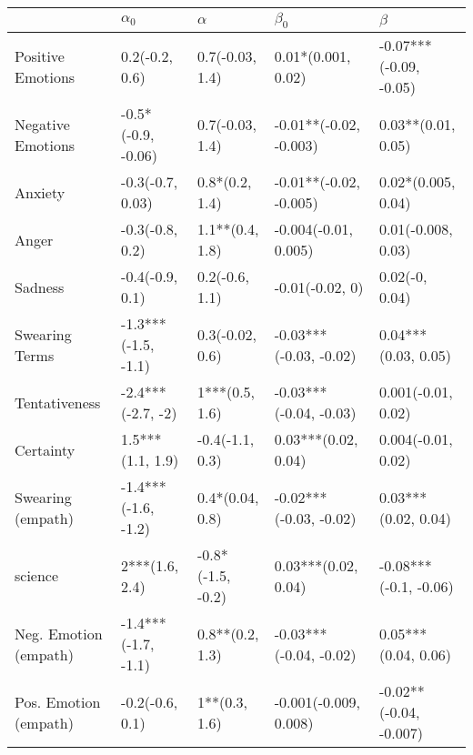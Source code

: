 \begin{tabular}{lllll}
\toprule
{} &           $\alpha_0$ &           $\alpha$ &               $\beta_0$ &                 $\beta$ \\
\midrule
Positive Emotions     &       0.2(-0.2, 0.6) &    0.7(-0.03, 1.4) &      0.01*(0.001, 0.02) &  -0.07***(-0.09, -0.05) \\
Negative Emotions     &   -0.5*(-0.9, -0.06) &    0.7(-0.03, 1.4) &  -0.01**(-0.02, -0.003) &      0.03**(0.01, 0.05) \\
Anxiety               &     -0.3(-0.7, 0.03) &     0.8*(0.2, 1.4) &  -0.01**(-0.02, -0.005) &      0.02*(0.005, 0.04) \\
Anger                 &      -0.3(-0.8, 0.2) &    1.1**(0.4, 1.8) &    -0.004(-0.01, 0.005) &      0.01(-0.008, 0.03) \\
Sadness               &      -0.4(-0.9, 0.1) &     0.2(-0.6, 1.1) &         -0.01(-0.02, 0) &          0.02(-0, 0.04) \\
Swearing Terms        &  -1.3***(-1.5, -1.1) &    0.3(-0.02, 0.6) &  -0.03***(-0.03, -0.02) &     0.04***(0.03, 0.05) \\
Tentativeness         &    -2.4***(-2.7, -2) &     1***(0.5, 1.6) &  -0.03***(-0.04, -0.03) &      0.001(-0.01, 0.02) \\
Certainty             &     1.5***(1.1, 1.9) &    -0.4(-1.1, 0.3) &     0.03***(0.02, 0.04) &      0.004(-0.01, 0.02) \\
Swearing (empath)     &  -1.4***(-1.6, -1.2) &    0.4*(0.04, 0.8) &  -0.02***(-0.03, -0.02) &     0.03***(0.02, 0.04) \\
science               &       2***(1.6, 2.4) &  -0.8*(-1.5, -0.2) &     0.03***(0.02, 0.04) &   -0.08***(-0.1, -0.06) \\
Neg. Emotion (empath) &  -1.4***(-1.7, -1.1) &    0.8**(0.2, 1.3) &  -0.03***(-0.04, -0.02) &     0.05***(0.04, 0.06) \\
Pos. Emotion (empath) &      -0.2(-0.6, 0.1) &      1**(0.3, 1.6) &   -0.001(-0.009, 0.008) &  -0.02**(-0.04, -0.007) \\
\bottomrule
\end{tabular}
